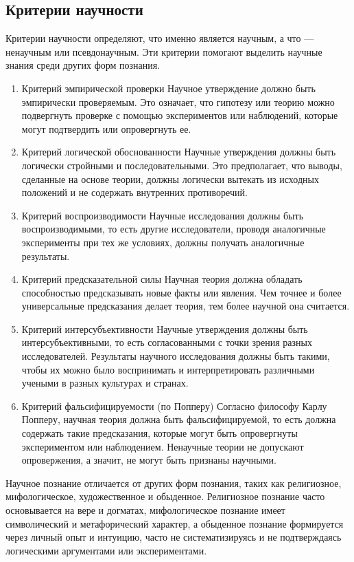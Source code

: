 \documentclass[12pt,a4paper]{article}
\begin{document}
	\subsection{Критерии научности}
	Критерии научности определяют, что именно является научным, а что — ненаучным или псевдонаучным. Эти критерии помогают выделить научные знания среди других форм познания.
	\begin{enumerate}
		\item Критерий эмпирической проверки
		Научное утверждение должно быть эмпирически проверяемым. Это означает, что гипотезу или теорию можно подвергнуть проверке с помощью экспериментов или наблюдений, которые могут подтвердить или опровергнуть ее.
		
		\item Критерий логической обоснованности
		Научные утверждения должны быть логически стройными и последовательными. Это предполагает, что выводы, сделанные на основе теории, должны логически вытекать из исходных положений и не содержать внутренних противоречий.
		
		\item Критерий воспроизводимости
		Научные исследования должны быть воспроизводимыми, то есть другие исследователи, проводя аналогичные эксперименты при тех же условиях, должны получать аналогичные результаты.
		
		\item Критерий предсказательной силы
		Научная теория должна обладать способностью предсказывать новые факты или явления. Чем точнее и более универсальные предсказания делает теория, тем более научной она считается.
		
		\item Критерий интерсубъективности
		Научные утверждения должны быть интерсубъективными, то есть согласованными с точки зрения разных исследователей. Результаты научного исследования должны быть такими, чтобы их можно было воспринимать и интерпретировать различными учеными в разных культурах и странах.
		
		\item Критерий фальсифицируемости (по Попперу)
		Согласно философу Карлу Попперу, научная теория должна быть фальсифицируемой, то есть должна содержать такие предсказания, которые могут быть опровергнуты экспериментом или наблюдением. Ненаучные теории не допускают опровержения, а значит, не могут быть признаны научными.
	\end{enumerate}
	
	Научное познание отличается от других форм познания, таких как религиозное, мифологическое, художественное и обыденное. Религиозное познание часто основывается на вере и догматах, мифологическое познание имеет символический и метафорический характер, а обыденное познание формируется через личный опыт и интуицию, часто не систематизируясь и не подтверждаясь логическими аргументами или экспериментами.
	
\end{document}
